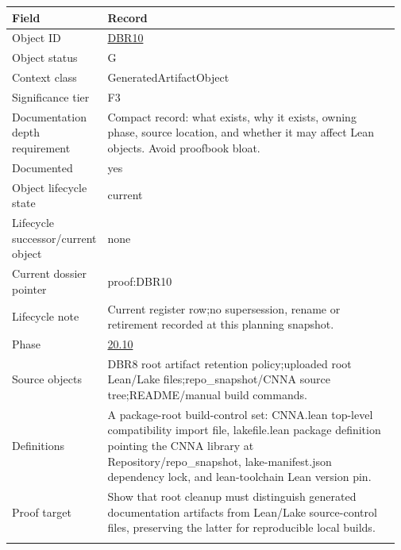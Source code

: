\begin{longtable}{L{0.16\linewidth} L{0.81\linewidth}}
\hline
\textbf{Field} & \textbf{Record}\\
\hline
Object ID & \hyperlink{object-row-DBR10}{DBR10}\\
\hline\addlinespace[0.20em]
Object status & G\\
\hline\addlinespace[0.20em]
Context class & GeneratedArtifactObject\\
\hline\addlinespace[0.20em]
Significance tier & F3\\
\hline\addlinespace[0.20em]
Documentation depth requirement & Compact record: what exists, why it exists, owning phase, source location, and whether it may affect Lean objects. Avoid proofbook bloat.\\
\hline\addlinespace[0.20em]
Documented & yes\\
\hline\addlinespace[0.20em]
Object lifecycle state & current\\
\hline\addlinespace[0.20em]
Lifecycle successor/\allowbreak{}current object & none\\
\hline\addlinespace[0.20em]
Current dossier pointer & proof:DBR10\\
\hline\addlinespace[0.20em]
Lifecycle note & Current register row;\newline no supersession, rename or retirement recorded at this planning snapshot.\\
\hline\addlinespace[0.20em]
Phase & \hyperlink{phase-row-20-10}{20.10}\\
\hline\addlinespace[0.20em]
Source objects & DBR8 root artifact retention policy;\newline uploaded root Lean/\allowbreak{}Lake files;\newline repo\_snapshot/\allowbreak{}CNNA source tree;\newline README/\allowbreak{}manual build commands.\\
\hline\addlinespace[0.20em]
Definitions & A package-root build-control set: CNNA.lean top-level compatibility import file, lakefile.lean package definition pointing the CNNA library at Repository/\allowbreak{}repo\_snapshot, lake-manifest.json dependency lock, and lean-toolchain Lean version pin.\\
\hline\addlinespace[0.20em]
Proof target & Show that root cleanup must distinguish generated documentation artifacts from Lean/\allowbreak{}Lake source-control files, preserving the latter for reproducible local builds.\\
\hline\addlinespace[0.20em]

\end{longtable}
